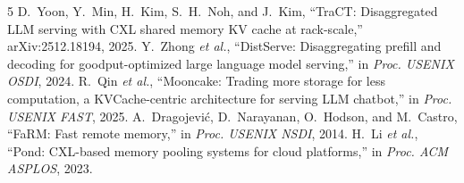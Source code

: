 \documentclass[conference]{IEEEtran}
\begin{document}
\begin{thebibliography}{5}
\footnotesize
{} D.~Yoon, Y.~Min, H.~Kim, S.~H.~Noh, and J.~Kim, ``TraCT: Disaggregated LLM serving with CXL shared memory KV cache at rack-scale,'' arXiv:2512.18194, 2025.
 Y.~Zhong \emph{et al.}, ``DistServe: Disaggregating prefill and decoding for goodput-optimized large language model serving,'' in \emph{Proc. USENIX OSDI}, 2024.
 R.~Qin \emph{et al.}, ``Mooncake: Trading more storage for less computation, a KVCache-centric architecture for serving LLM chatbot,'' in \emph{Proc. USENIX FAST}, 2025.
 A.~Dragojevi\'c, D.~Narayanan, O.~Hodson, and M.~Castro, ``FaRM: Fast remote memory,'' in \emph{Proc. USENIX NSDI}, 2014.
 H.~Li \emph{et al.}, ``Pond: CXL-based memory pooling systems for cloud platforms,'' in \emph{Proc. ACM ASPLOS}, 2023.
\end{thebibliography}
\end{document}
